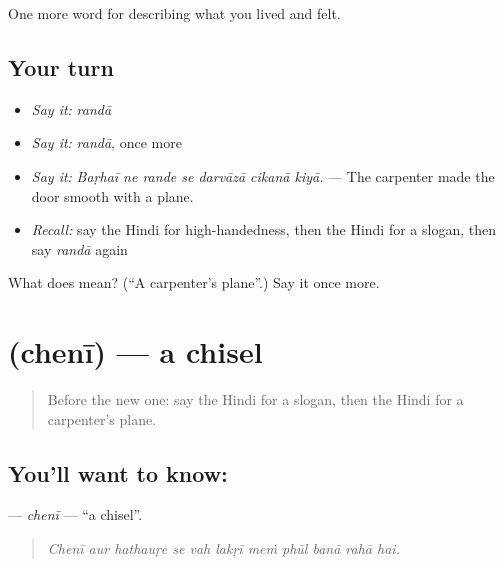 \begin{grammarlens}[title={What you've built}]
One more word for describing what you lived and felt.
\end{grammarlens}

\subsection*{Your turn}
\begin{itemize}
\raggedright
  \item \emph{Say it:} \emph{randā}
  \item \emph{Say it:} \emph{randā}, once more
  \item \emph{Say it:} \emph{Baṛhaī ne rande se darvāzā cikanā kiyā.} — The carpenter made the door smooth with a plane.
  \item \emph{Recall:} say the Hindi for high-handedness, then the Hindi for a slogan, then say \emph{randā} again
\end{itemize}

\begin{tcolorbox}[breakable,colback=teal!4,colframe=teal!35!black,title={Before you move on}]
What does  mean? (\textquotedblleft{}A carpenter's plane\textquotedblright{}.) Say it once more.
\end{tcolorbox}
\section[\texorpdfstring{\hi{छेनी} (chenī)}{छेनी (chenī)}]{ (chenī) — a chisel}

\label{lesson:HI-C510-cheni}



\begin{quote}
Before the new one: say the Hindi for a slogan, then the Hindi for a carpenter's plane.
\end{quote}

\subsection*{You'll want to know: }
\textbf{} — \emph{chenī} — \textquotedblleft{}a chisel\textquotedblright{}.

\begin{quote}
          
\end{quote}

\begin{quote}
\emph{Chenī aur hathauṛe se vah lakṛī meṁ phūl banā rahā hai.}
\end{quote}

